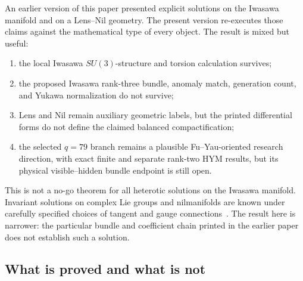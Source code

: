 \documentclass[11pt]{article}
\theoremstyle{definition}
\theoremstyle{remark}
\begin{document}
An earlier version of this paper presented explicit solutions on the Iwasawa
manifold and on a Lens--Nil geometry.  The present version re-executes those
claims against the mathematical type of every object.  The result is mixed but
useful:
\begin{enumerate}[leftmargin=1.6em]
\item the local Iwasawa \(SU(3)\)-structure and torsion calculation survives;
\item the proposed Iwasawa rank-three bundle, anomaly match, generation count,
      and Yukawa normalization do not survive;
\item Lens and Nil remain auxiliary geometric labels, but the printed
      differential forms do not define the claimed balanced compactification;
\item the selected \(q=79\) branch remains a plausible Fu--Yau-oriented
      research direction, with exact finite and separate rank-two HYM results,
      but its physical visible--hidden bundle endpoint is still open.
\end{enumerate}

This is not a no-go theorem for all heterotic solutions on the Iwasawa
manifold.  Invariant solutions on complex Lie groups and nilmanifolds are
known under carefully specified choices of tangent and gauge
connections~\cite{FernandezEtAl2009,FeiYau2015}.  The result here is narrower:
the particular bundle and coefficient chain printed in the earlier paper does
not establish such a solution.

\subsection{What is proved and what is not}
\end{document}
